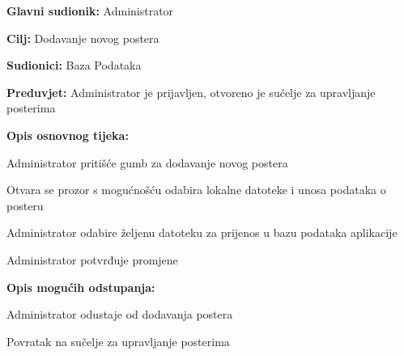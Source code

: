 					\noindent {}
					\begin{packed_item}
						
						\item \textbf{Glavni sudionik: } Administrator
						\item  \textbf{Cilj:} Dodavanje novog postera
						\item  \textbf{Sudionici:} Baza Podataka
						\item  \textbf{Preduvjet:} Administrator je prijavljen, otvoreno je sučelje za upravljanje posterima
						\item  \textbf{Opis osnovnog tijeka:}
						
						\item[] \begin{packed_enum}
							
							\item Administrator pritišće gumb za dodavanje novog postera
							\item Otvara se prozor s mogućnošću odabira lokalne datoteke i unosa podataka o posteru
							\item Administrator odabire željenu datoteku za prijenos u bazu podataka aplikacije
							\item Administrator potvrđuje promjene
						\end{packed_enum}
						
						\item  \textbf{Opis mogućih odstupanja:}
						
						\item[] \begin{packed_item}
							
							\item[2.a] Administrator odustaje od dodavanja postera
							\item[] \begin{packed_enum}
								
								\item Povratak na sučelje za upravljanje posterima
							\end{packed_enum}
							
						\end{packed_item}
					\end{packed_item}
					
